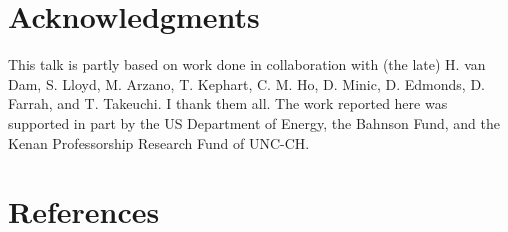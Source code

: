 \documentclass[a4paper]{jpconf}
\begin{document}
\section*{Acknowledgments}

This talk is partly based on work done in collaboration with (the late) H. 
van Dam, S. Lloyd, M. Arzano, T. Kephart, C. M. Ho, D. Minic, D. Edmonds,
D. Farrah, and T. Takeuchi.  I thank them all.  The work reported  
here was supported in part by the US Department of Energy, the Bahnson
Fund, and the Kenan Professorship Research Fund of UNC-CH.\\

%

\section*{References}
\end{document}
